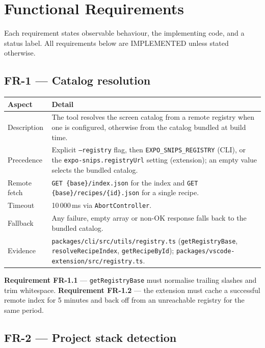\chapter{Functional Requirements}
\label{ch:functional-requirements}

Each requirement states observable behaviour, the implementing code, and a status
label. All requirements below are IMPLEMENTED unless stated otherwise.

\section{FR-1 --- Catalog resolution}

\begin{longtable}{p{3cm}p{11cm}}
\toprule
\textbf{Aspect} & \textbf{Detail} \\
\midrule
\endhead
Description & The tool resolves the screen catalog from a remote registry when one is
configured, otherwise from the catalog bundled at build time. \\
Precedence & Explicit \texttt{--registry} flag, then \texttt{EXPO\_SNIPS\_REGISTRY}
(CLI), or the \texttt{expo-snips.registryUrl} setting (extension); an empty value
selects the bundled catalog. \\
Remote fetch & \texttt{GET \{base\}/index.json} for the index and
\texttt{GET \{base\}/recipes/\{id\}.json} for a single recipe. \\
Timeout & 10\,000\,ms via \texttt{AbortController}. \\
Fallback & Any failure, empty array or non-OK response falls back to the bundled catalog. \\
Evidence & \texttt{packages/cli/src/utils/registry.ts} (\texttt{getRegistryBase},
\texttt{resolveRecipeIndex}, \texttt{getRecipeById});
\texttt{packages/vscode-extension/src/registry.ts}. \\
\bottomrule
\end{longtable}

\textbf{Requirement FR-1.1} --- \texttt{getRegistryBase} must normalise trailing
slashes and trim whitespace.
\textbf{Requirement FR-1.2} --- the extension must cache a successful remote index
for 5 minutes and back off from an unreachable registry for the same period.

\section{FR-2 --- Project stack detection}

